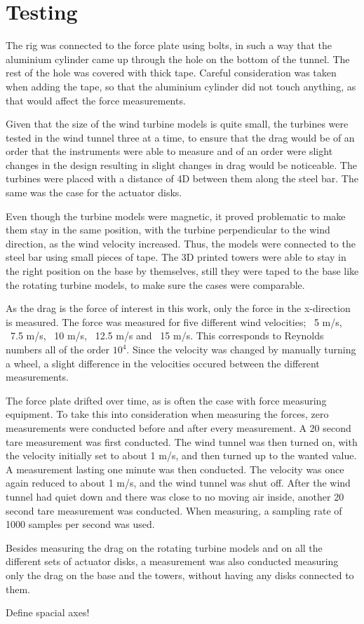 \section{Testing}
The rig was connected to the force plate using bolts, in such a way that the aluminium cylinder came up through the hole on the bottom of the tunnel. The rest of the hole was covered with thick tape. Careful consideration was taken when adding the tape, so that the aluminium cylinder did not touch anything, as that would affect the force measurements. 

Given that the size of the wind turbine models is quite small, the turbines were tested in the wind tunnel three at a time, to ensure that the drag would be of an order that the instruments were able to measure and of an order were slight changes in the design resulting in slight changes in drag would be noticeable. The turbines were placed with a distance of 4D between them along the steel bar. The same was the case for the actuator disks. %

Even though the turbine models were magnetic, it proved problematic to make them stay in the same position, with the turbine perpendicular to the wind direction, as the wind velocity increased. Thus, the models were connected to the steel bar using small pieces of tape. The 3D printed towers were able to stay in the right position on the base by themselves, still they were taped to the base like the rotating turbine models, to make sure the cases were comparable. 

As the drag is the force of interest in this work, only the force in the x-direction is measured. The force was measured for five different wind velocities; ~5 m/s, ~7.5 m/s, ~10 m/s, ~12.5 m/s and ~15 m/s. This corresponds to Reynolds numbers all of the order $10^4$. Since the velocity was changed by manually turning a wheel, a slight difference in the velocities occured between the different measurements. 

The force plate drifted over time, as is often the case with force measuring equipment. To take this into consideration when measuring the forces, zero measurements were conducted before and after every measurement. A 20 second tare measurement was first conducted. The wind tunnel was then turned on, with the velocity initially set to about 1 m/s, and then turned up to the wanted value. A measurement lasting one minute was then conducted. The velocity was once again reduced to about 1 m/s, and the wind tunnel was shut off. After the wind tunnel had quiet down and there was close to no moving air inside, another 20 second tare measurement was conducted. When measuring, a sampling rate of 1000 samples per second was used. 

Besides measuring the drag on the rotating turbine models and on all the different sets of actuator disks, a measurement was also conducted measuring only the drag on the base and the towers, without having any disks connected to them. 

Define spacial axes! 

